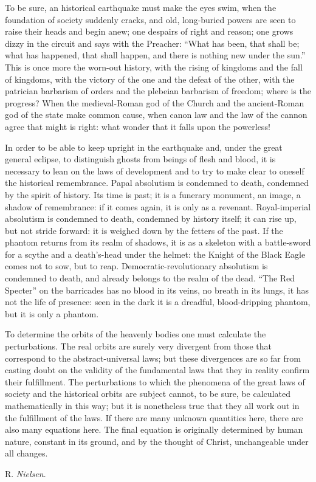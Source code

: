 \documentclass[12pt,a4paper,openany]{book}
\newcommand{\opage}[1]{\marginnote{\footnotesize\textit{[#1]}}}
\newcommand{\signature}[1]{\par\smallskip\hfill #1\hspace*{2em}\par}
\begin{document}
To be sure, an historical earthquake must make the eyes
swim, when the foundation of society suddenly cracks, and
old, long-buried powers are seen to raise their heads
and begin anew; one despairs of right and reason;
one grows dizzy in the circuit and says with the Preacher: ``What
has been, that shall be; what has happened, that shall
happen, and there is nothing new under the sun.'' This is once more
the worn-out history, with the rising of kingdoms and the
fall of kingdoms, with the victory of the one and the defeat of the other, with
the patrician barbarism of orders and the plebeian barbarism of freedom;
where is the progress? When the medieval-Roman
god of the Church and the ancient-Roman god of the state make common cause,
when canon law and the law of the cannon agree that
might is right: what wonder that it falls upon the
powerless!

In order to be able to keep upright in the earthquake and, under
the great general eclipse, to distinguish ghosts from
beings of flesh and blood, it is necessary to
lean on the laws of development and to try to make clear to oneself the
historical remembrance. Papal absolutism is condemned
to death, condemned by the spirit of history. Its time is past;
it is a funerary monument, an image, a shadow
of remembrance: if it comes again, it is only as a revenant.
Royal-imperial absolutism is condemned to
\setcounter{footnote}{0}%
\opage{315}death, condemned by history itself; it can rise up,
but not stride forward: it is weighed down by the fetters
of the past. If the phantom returns from its realm of shadows,
it is as a skeleton with a battle-sword for a scythe
and a death's-head under the helmet: the Knight of the Black
Eagle comes not to sow, but to reap. Democratic-revolutionary
absolutism is condemned to death,
and already belongs to the realm of the dead. ``The Red Specter''
on the barricades has no blood in its veins, no breath in
its lungs, it has not the life of presence: seen in the dark
it is a dreadful, blood-dripping phantom, but it is
only a phantom.

To determine the orbits of the heavenly bodies one must
calculate the perturbations. The real orbits are
surely very divergent from those that correspond to the
abstract-universal laws; but these divergences are so far
from casting doubt on the validity of the fundamental laws that they in
reality confirm their fulfillment. The perturbations
to which the phenomena of the great laws of society and
the historical orbits are subject cannot, to be sure,
be calculated mathematically in this way; but it is nonetheless
true that they all work out in the fulfillment of the laws. If there are
many unknown quantities here, there are also many
equations here. The final equation is originally determined by
human nature, constant in its ground, and by the thought of Christ,
unchangeable under all changes.
\signature{R. \emph{Nielsen}.}
\end{document}
